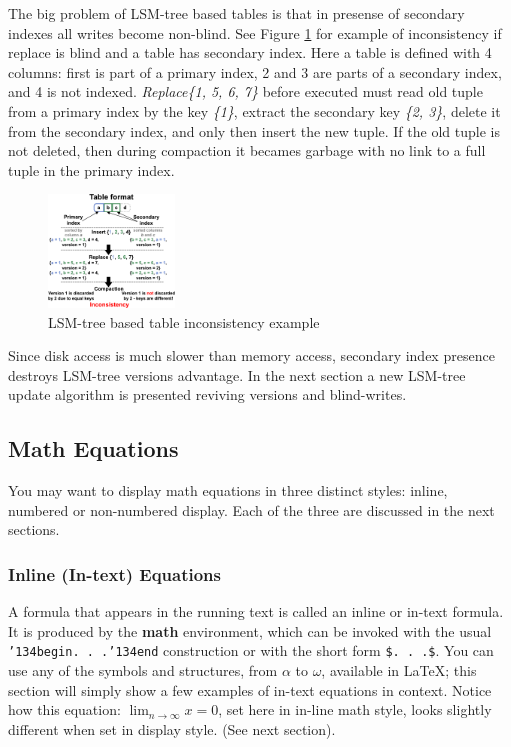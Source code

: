 \documentclass{vldb}
\begin{document}
The big problem of LSM-tree based tables is that in presense of secondary
indexes all writes become non-blind. See Figure \ref{fig:inconsistent_example}
for example of inconsistency if replace is blind and a table has secondary
index. Here a table is defined with 4 columns: first is part of a primary index,
2 and 3 are parts of a secondary index, and 4 is not indexed.
\textit{Replace\{1, 5, 6, 7\}} before executed must read old tuple from a
primary index by the key \textit{\{1\}}, extract the secondary key
\textit{\{2, 3\}}, delete it from the secondary index, and only then insert the
new tuple. If the old tuple is not deleted, then during compaction it becames
garbage with no link to a full tuple in the primary index.
\begin{figure}
\centering
\includegraphics[width=0.3\textwidth]{inconsistent_example}
\caption{LSM-tree based table inconsistency example}
\label{fig:inconsistent_example}
\end{figure}

Since disk access is much slower than memory access, secondary index presence
destroys LSM-tree versions advantage. In the next section a new LSM-tree update
algorithm is presented reviving versions and blind-writes.

\subsection{Math Equations}
You may want to display math equations in three distinct styles:
inline, numbered or non-numbered display.  Each of
the three are discussed in the next sections.

\subsubsection{Inline (In-text) Equations}
A formula that appears in the running text is called an
inline or in-text formula.  It is produced by the
\textbf{math} environment, which can be
invoked with the usual \texttt{{\char'134}begin. . .{\char'134}end}
construction or with the short form \texttt{\$. . .\$}. You
can use any of the symbols and structures,
from $\alpha$ to $\omega$, available in
\LaTeX\cite{Lamport:LaTeX}; this section will simply show a
few examples of in-text equations in context. Notice how
this equation: \begin{math}\lim_{n\rightarrow \infty}x=0\end{math},
set here in in-line math style, looks slightly different when
set in display style.  (See next section).
\end{document}

